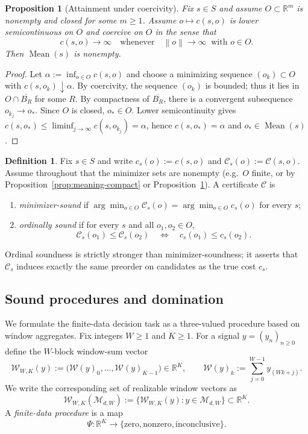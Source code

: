 \documentclass[11pt,reqno]{amsart}
\newtheorem{proposition}[theorem]{Proposition}
\theoremstyle{definition}
\newtheorem{definition}[theorem]{Definition}
\theoremstyle{remark}
\newcommand{\R}{\mathbb{R}}
\newcommand{\1}{\mathbf{1}}
\newcommand{\norm}[1]{\left\lVert #1 \right\rVert}
\newcommand{\zero}{\mathrm{zero}}
\newcommand{\nonzero}{\mathrm{nonzero}}
\newcommand{\inconclusive}{\mathrm{inconclusive}}
\newcommand{\Mean}{\operatorname{Mean}}
\begin{document}
\begin{proposition}[Attainment under coercivity]\label{prop:meaning-coercive}
Fix $s\in S$ and assume $O\subset\R^m$ is nonempty and closed for some $m\ge 1$.
Assume $o\mapsto c(s,o)$ is lower semicontinuous on $O$ and \emph{coercive} on $O$ in the sense that
\[
c(s,o)\to\infty \quad\text{whenever}\quad \norm{o}\to\infty\ \text{ with }o\in O.
\]
Then $\Mean(s)$ is nonempty.
\end{proposition}

\begin{proof}
Let $\alpha:=\inf_{o\in O}c(s,o)$ and choose a minimizing sequence $(o_k)\subset O$ with $c(s,o_k)\downarrow\alpha$.
By coercivity, the sequence $(o_k)$ is bounded; thus it lies in $O\cap \overline{B_R}$ for some $R$.
By compactness of $\overline{B_R}$, there is a convergent subsequence $o_{k_j}\to o_\ast$.
Since $O$ is closed, $o_\ast\in O$.
Lower semicontinuity gives $c(s,o_\ast)\le \liminf_{j\to\infty} c(s,o_{k_j})=\alpha$, hence $c(s,o_\ast)=\alpha$ and $o_\ast\in\Mean(s)$.
\end{proof}


\begin{definition}\label{def:sound}
Fix $s\in S$ and write $c_s(o):=c(s,o)$ and $\mathcal{C}_s(o):=\mathcal{C}(s,o)$.
Assume throughout that the minimizer sets are nonempty (e.g.\ $O$ finite, or by Proposition~\ref{prop:meaning-compact} or Proposition~\ref{prop:meaning-coercive}).
A certificate $\mathcal{C}$ is
\begin{enumerate}[label=\textup{(\roman*)},leftmargin=2.2em]
\item \emph{minimizer-sound} if $\arg\min_{o\in O}\mathcal{C}_s(o)=\arg\min_{o\in O}c_s(o)$ for every $s$;
\item \emph{ordinally sound} if for every $s$ and all $o_1,o_2\in O$,
\[
\mathcal{C}_s(o_1)\le \mathcal{C}_s(o_2)\quad\Longleftrightarrow\quad c_s(o_1)\le c_s(o_2).
\]
\end{enumerate}
Ordinal soundness is strictly stronger than minimizer-soundness; it asserts that $\mathcal{C}_s$ induces
exactly the same preorder on candidates as the true cost $c_s$.
\end{definition}

\subsection{Sound procedures and domination}\label{subsec:domination}

We formulate the finite-data decision task as a three-valued procedure based on window aggregates.
Fix integers $W\ge 1$ and $K\ge 1$. For a signal $y=(y_n)_{n\ge 0}$ define the $W$-block window-sum
vector
\[
\mathcal{W}_{W,K}(y):=\big(\mathcal{W}(y)_0,\dots,\mathcal{W}(y)_{K-1}\big)\in\R^{K},
\qquad
\mathcal{W}(y)_k:=\sum_{j=0}^{W-1}y_{(Wk+j)}.
\]
We write the corresponding set of realizable window vectors as
\[
\mathcal{W}_{W,K}(\mathcal{M}_{d,W}):=\{\mathcal{W}_{W,K}(y):y\in\mathcal{M}_{d,W}\}\subset\R^{K}.
\]
A \emph{finite-data procedure} is a map
\[
\Psi:\R^{K}\to\{\zero,\nonzero,\inconclusive\}.
\]
\end{document}
